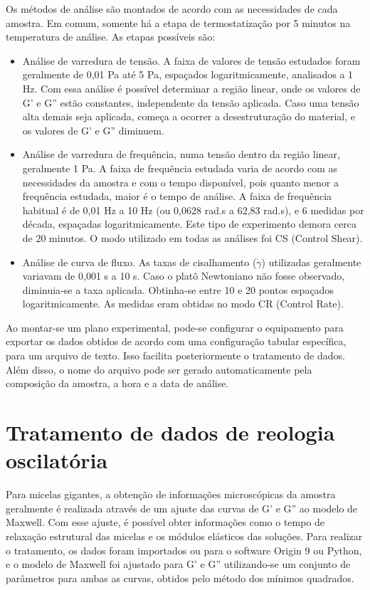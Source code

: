 		Os métodos de análise são montados de acordo com as necessidades de cada amostra. Em comum, somente há a etapa de termostatização por 5 minutos na temperatura de análise. As etapas possíveis são:
		
		\begin{itemize}
			\item Análise de varredura de tensão. A faixa de valores de tensão estudados foram geralmente de 0,01 Pa até 5 Pa, espaçados logaritmicamente, analisados a 1 Hz. Com essa análise é possível determinar a região linear, onde os valores de G' e G'' estão constantes, independente da tensão aplicada. Caso uma tensão alta demais seja aplicada, começa a ocorrer a desestruturação do material, e os valores de G' e G'' diminuem.
			
			\item Análise de varredura de frequência, numa tensão dentro da região linear, geralmente 1 Pa. A faixa de frequência estudada varia de acordo com as necessidades da amostra e com o tempo disponível, pois quanto menor a frequência estudada, maior é o tempo de análise. A faixa de frequência habitual é de 0,01 Hz a 10 Hz (ou 0,0628 rad.s\menosUm{} a 62,83 rad.s\menosUm), e 6 medidas por década, espaçadas logaritmicamente. Este tipo de experimento demora cerca de 20 minutos. O modo utilizado em todas as análises foi CS (Control Shear).
			
			\item Análise de curva de fluxo. As taxas de cisalhamento ($\dot{\gamma}$) utilizadas geralmente variavam de 0,001 s\menosUm{} a 10 s\menosUm. Caso o platô Newtoniano não fosse observado, diminuia-se a taxa aplicada. Obtinha-se entre 10 e 20 pontos espaçados logaritmicamente. As medidas eram obtidas no modo CR (Control Rate).
		\end{itemize}
		
		Ao montar-se um plano experimental, pode-se configurar o equipamento para exportar os dados obtidos de acordo com uma configuração tabular específica, para um arquivo de texto. Isso facilita posteriormente o tratamento de dados. Além disso, o nome do arquivo pode ser gerado automaticamente pela composição da amostra, a hora e a data de análise.
		
		\section{Tratamento de dados de reologia oscilatória}
		
		Para micelas gigantes, a obtenção de informações microscópicas da amostra geralmente é realizada através de um ajuste das curvas de G' e G'' ao modelo de Maxwell. Com esse ajuste, é possível obter informações como o tempo de relaxação estrutural das micelas e os módulos elásticos das soluções. Para realizar o tratamento, os dados foram importados ou para o software Origin\textcopyright{} 9 ou Python, e o modelo de Maxwell foi ajustado para G' e G'' utilizando-se um conjunto de parâmetros para ambas as curvas, obtidos pelo método dos mínimos quadrados.
		

